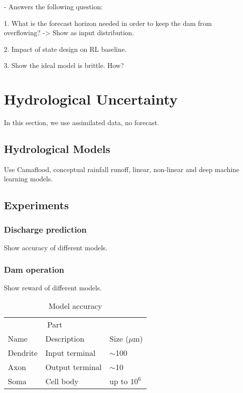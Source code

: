 \documentclass{article}
\begin{document}
 - Answers the following question:

1. What is the forecast horizon needed in order to keep the dam from overflowing?
-> Show as input distribution.

2. Impact of state design on RL baseline.

3. Show the ideal model is brittle. How?

\section{Hydrological Uncertainty}
\label{sec:Hydrological Uncertainty}

In this section, we use assimilated data, no forecast.

\subsection{Hydrological Models}
\label{sec:Hydrological Models}

Use Camaflood, conceptual rainfall runoff, linear, non-linear and deep machine learning models.

\subsection{Experiments}
\label{sec:Hydrological Experiments}

\subsubsection{Discharge prediction}

Show accuracy of different models.

\subsubsection{Dam operation}

Show reward of different models.

\begin{table}
	\caption{Model accuracy}
	\centering
	\begin{tabular}{lll}
		\toprule
		\multicolumn{2}{c}{Part}                   \\
		\cmidrule(r){1-2}
		Name     & Description     & Size ($\mu$m) \\
		\midrule
		Dendrite & Input terminal  & $\sim$100     \\
		Axon     & Output terminal & $\sim$10      \\
		Soma     & Cell body       & up to $10^6$  \\
		\bottomrule
	\end{tabular}
	\label{tab:table}
\end{table}
\end{document}
